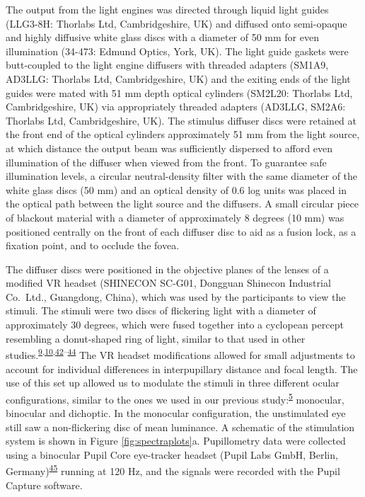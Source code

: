 \documentclass[
]{article}
\begin{document}
The output from the light engines was directed through liquid light guides (LLG3-8H: Thorlabs Ltd, Cambridgeshire, UK) and diffused onto semi-opaque and highly diffusive white glass discs with a diameter of 50 mm for even illumination (34-473: Edmund Optics, York, UK). The light guide gaskets were butt-coupled to the light engine diffusers with threaded adapters (SM1A9, AD3LLG: Thorlabs Ltd, Cambridgeshire, UK) and the exiting ends of the light guides were mated with 51 mm depth optical cylinders (SM2L20: Thorlabs Ltd, Cambridgeshire, UK) via appropriately threaded adapters (AD3LLG, SM2A6: Thorlabs Ltd, Cambridgeshire, UK). The stimulus diffuser discs were retained at the front end of the optical cylinders approximately 51 mm from the light source, at which distance the output beam was sufficiently dispersed to afford even illumination of the diffuser when viewed from the front. To guarantee safe illumination levels, a circular neutral-density filter with the same diameter of the white glass discs (50 mm) and an optical density of 0.6 log units was placed in the optical path between the light source and the diffusers. A small circular piece of blackout material with a diameter of approximately 8 degrees (10 mm) was positioned centrally on the front of each diffuser disc to aid as a fusion lock, as a fixation point, and to occlude the fovea.

The diffuser discs were positioned in the objective planes of the lenses of a modified VR headset (SHINECON SC-G01, Dongguan Shinecon Industrial Co.~Ltd., Guangdong, China), which was used by the participants to view the stimuli. The stimuli were two discs of flickering light with a diameter of approximately 30 degrees, which were fused together into a cyclopean percept resembling a donut-shaped ring of light, similar to that used in other studies.\textsuperscript{\protect\hyperlink{ref-Murray2018}{9},\protect\hyperlink{ref-Spitschan2014}{10},\protect\hyperlink{ref-Barrionuevo2016}{42}--\protect\hyperlink{ref-Zele2018}{44}} The VR headset modifications allowed for small adjustments to account for individual differences in interpupillary distance and focal length. The use of this set up allowed us to modulate the stimuli in three different ocular configurations, similar to the ones we used in our previous study:\textsuperscript{\protect\hyperlink{ref-Segala2023}{5}} monocular, binocular and dichoptic. In the monocular configuration, the unstimulated eye still saw a non-flickering disc of mean luminance. A schematic of the stimulation system is shown in Figure \ref{fig:spectraplots}a. Pupillometry data were collected using a binocular Pupil Core eye-tracker headset (Pupil Labs GmbH, Berlin, Germany)\textsuperscript{\protect\hyperlink{ref-Kassner2014}{45}} running at 120 Hz, and the signals were recorded with the Pupil Capture software.
\end{document}

